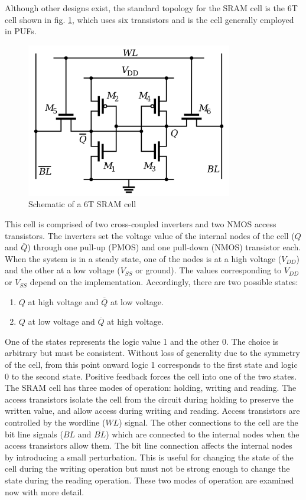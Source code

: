Although other designs exist, the standard topology for the SRAM cell is the 6T cell shown in fig. \ref{fig:SRAM}, which uses six transistors and is the cell generally employed in PUFs. 

\begin{figure}[H]
    \centering
    \includegraphics[width=9cm]{images/SRAM_Cell.png}
    \caption{Schematic of a 6T SRAM cell}
    \label{fig:SRAM}
\end{figure}

This cell is comprised of two cross-coupled inverters and two NMOS access transistors. The inverters set the voltage value of the internal nodes of the cell ($Q$ and $\overline{Q}$) through one pull-up (PMOS) and one pull-down (NMOS) transistor each. When the system is in a steady state, one of the nodes is at a high voltage ($V_{DD}$) and the other at a low voltage ($V_{SS}$ or ground). The values corresponding to $V_{DD}$ or $V_{SS}$ depend on the implementation. Accordingly, there are two possible states:

\begin{enumerate}
    \item $Q$ at high voltage and $\overline{Q}$ at low voltage.
    \item $Q$ at low voltage and $\overline{Q}$ at high voltage.
\end{enumerate}

One of the states represents the logic value 1 and the other 0. The choice is arbitrary but must be consistent. Without loss of generality due to the symmetry of the cell, from this point onward logic 1 corresponds to the first state and logic 0 to the second state. Positive feedback forces the cell into one of the two states. The SRAM cell has three modes of operation: holding, writing and reading. The access transistors isolate the cell from the circuit during holding to preserve the written value, and allow access during writing and reading. Access transistors are controlled by the wordline ($WL$) signal. The other connections to the cell are the bit line signals ($BL$ and $\overline{BL}$) which are connected to the internal nodes when the access transistors allow them. The bit line connection affects the internal nodes by introducing a small perturbation. This is useful for changing the state of the cell during the writing operation but must not be strong enough to change the state during the reading operation. These two modes of operation are examined now with more detail. 

